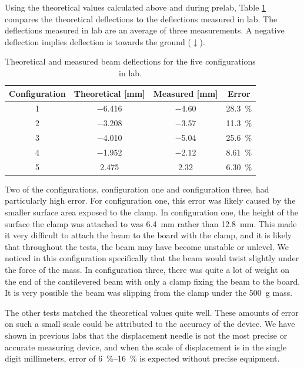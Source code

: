 \documentclass[12 pt]{article}
\begin{document}
Using the theoretical values calculated above and during prelab, Table \ref{tbl:compare} compares the theoretical deflections to the deflections measured in lab. The deflections measured in lab are an average of three measurements. A negative deflection implies deflection is towards the ground ($\downarrow$).

\begin{table}[!htbp]
\caption{Theoretical and measured beam deflections for the five configurations in lab.}
\begin{center}
	\begin{tabular}{|c|c|c|c|}
		\hline
		Configuration&Theoretical [\unit{\mm}]&Measured [\unit{\mm}]&Error\\
		\hline
		1&\num{-6.416}&\num{-4.60}&\qty{28.3}{\percent}\\
		\hline
		2&\num{-3.208}&\num{-3.57}&\qty{11.3}{\percent}\\
		\hline
		3&\num{-4.010}&\num{-5.04}&\qty{25.6}{\percent}\\
		\hline
		4&\num{-1.952}&\num{-2.12}&\qty{8.61}{\percent}\\
		\hline
		5&\num{2.475}&\num{2.32}&\qty{6.30}{\percent}\\
		\hline
	\end{tabular}
\end{center}
\label{tbl:compare}
\end{table}

Two of the configurations, configuration one and configuration three, had particularly high error. For configuration one, this error was likely caused by the smaller surface area exposed to the clamp. In configuration one, the height of the surface the clamp was attached to was \qty{6.4}{\mm} rather than \qty{12.8}{\mm}. This made it very difficult to attach the beam to the board with the clamp, and it is likely that throughout the tests, the beam may have become unstable or unlevel. We noticed in this configuration specifically that the beam would twist slightly under the force of the mass. In configuration three, there was quite a lot of weight on the end of the cantilevered beam with only a clamp fixing the beam to the board. It is very possible the beam was slipping from the clamp under the \qty{500}{\g} mass.

The other tests matched the theoretical values quite well. These amounts of error on such a small scale could be attributed to the accuracy of the device. We have shown in previous labs that the displacement needle is not the most precise or accurate measuring device, and when the scale of displacement is in the single digit millimeters, error of \qtyrange{6}{16}{\percent} is expected without precise equipment.
\end{document}
